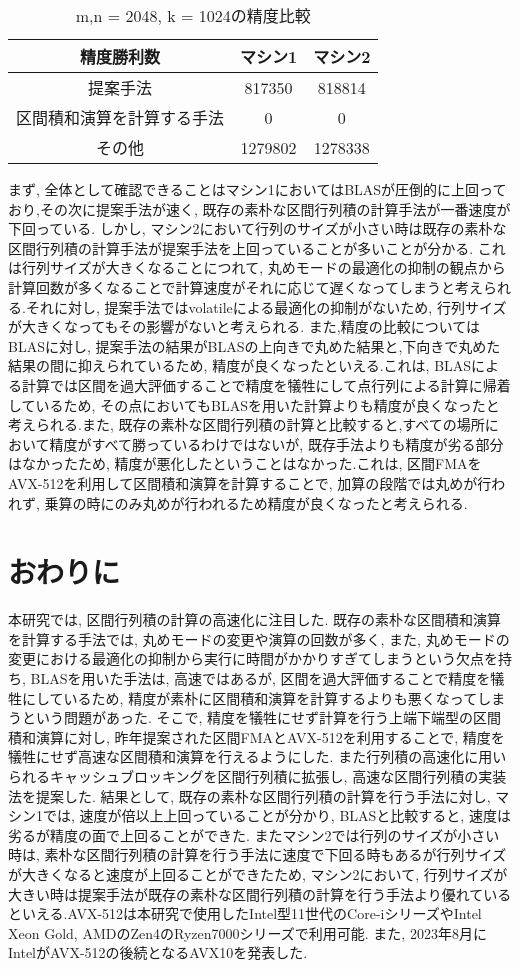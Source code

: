 \documentclass[11pt,a4paper]{jsreport}
\theoremstyle{definition}
\begin{document}
\begin{table}[H]
\centering
\small
\caption{m,n = 2048, k = 1024の精度比較}
\begin{tabular}{c|c|c}
\hline
精度勝利数 & マシン1 & マシン2 \\ \hline \hline
提案手法 & 817350 & 818814 \\ \hline
区間積和演算を計算する手法 & 0 & 0 \\ \hline
その他 & 1279802 & 1278338 \\ \hline
\end{tabular}
\end{table}

\indent まず, 全体として確認できることはマシン1においてはBLASが圧倒的に上回っており,その次に提案手法が速く, 既存の素朴な区間行列積の計算手法が一番速度が下回っている. しかし, マシン2において行列のサイズが小さい時は既存の素朴な区間行列積の計算手法が提案手法を上回っていることが多いことが分かる. これは行列サイズが大きくなることにつれて, 丸めモードの最適化の抑制の観点から計算回数が多くなることで計算速度がそれに応じて遅くなってしまうと考えられる.それに対し, 提案手法ではvolatileによる最適化の抑制がないため, 行列サイズが大きくなってもその影響がないと考えられる. また,精度の比較についてはBLASに対し, 提案手法の結果がBLASの上向きで丸めた結果と,下向きで丸めた結果の間に抑えられているため, 精度が良くなったといえる.これは, BLASによる計算では区間を過大評価することで精度を犠牲にして点行列による計算に帰着しているため, その点においてもBLASを用いた計算よりも精度が良くなったと考えられる.また, 既存の素朴な区間行列積の計算と比較すると,すべての場所において精度がすべて勝っているわけではないが, 既存手法よりも精度が劣る部分はなかったため, 精度が悪化したということはなかった.これは, 区間FMAをAVX-512を利用して区間積和演算を計算することで, 加算の段階では丸めが行われず, 乗算の時にのみ丸めが行われるため精度が良くなったと考えられる.

\newpage
\chapter{おわりに}
	本研究では, 区間行列積の計算の高速化に注目した. 既存の素朴な区間積和演算を計算する手法では, 丸めモードの変更や演算の回数が多く, また, 丸めモードの変更における最適化の抑制から実行に時間がかかりすぎてしまうという欠点を持ち, BLASを用いた手法は, 高速ではあるが, 区間を過大評価することで精度を犠牲にしているため, 精度が素朴に区間積和演算を計算するよりも悪くなってしまうという問題があった. そこで, 精度を犠牲にせず計算を行う上端下端型の区間積和演算に対し, 昨年提案された区間FMAとAVX-512を利用することで, 精度を犠牲にせず高速な区間積和演算を行えるようにした. また行列積の高速化に用いられるキャッシュブロッキングを区間行列積に拡張し, 高速な区間行列積の実装法を提案した. 結果として, 既存の素朴な区間行列積の計算を行う手法に対し, マシン1では, 速度が倍以上上回っていることが分かり, BLASと比較すると, 速度は劣るが精度の面で上回ることができた. またマシン2では行列のサイズが小さい時は, 素朴な区間行列積の計算を行う手法に速度で下回る時もあるが行列サイズが大きくなると速度が上回ることができたため, マシン2において, 行列サイズが大きい時は提案手法が既存の素朴な区間行列積の計算を行う手法より優れているといえる.AVX-512は本研究で使用したIntel型11世代のCore-iシリーズやIntel Xeon Gold, AMDのZen4のRyzen7000シリーズで利用可能. また, 2023年8月にIntelがAVX-512の後続となるAVX10を発表した. 
\clearpage
\end{document}
